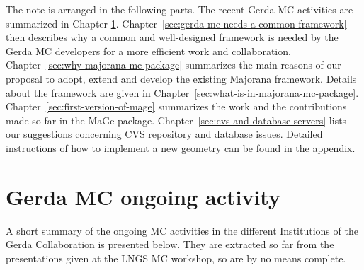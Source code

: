 \documentclass[a4paper,12pt,twoside]{article}
\begin{document}
The note is arranged in the following parts.
The recent Gerda MC activities are summarized in Chapter 
\ref{sec:gerda-mc-ongoing-activity}.
Chapter~\ref{sec:gerda-mc-needs-a-common-framework} then 
describes why a common and well-designed framework is needed  
by the Gerda MC developers for a more efficient work and collaboration. 
Chapter~\ref{sec:why-majorana-mc-package} summarizes
the main reasons of our proposal to adopt, extend and develop the 
existing Majorana framework.
Details about the framework are given in 
Chapter~\ref{sec:what-is-in-majorana-mc-package}.
Chapter~\ref{sec:first-version-of-mage}
summarizes the work and the contributions made so far in the 
MaGe package. 
Chapter~\ref{sec:cvs-and-database-servers} lists
our suggestions concerning CVS repository and database issues.
Detailed instructions of how to implement a new geometry
can be found in the appendix.


\section{Gerda MC ongoing activity}
\label{sec:gerda-mc-ongoing-activity}

A short summary of the ongoing MC activities in the different  
Institutions of the Gerda Collaboration is presented below.
They are extracted so far from the presentations given at the LNGS
MC workshop, so are by no means complete.
\end{document}
